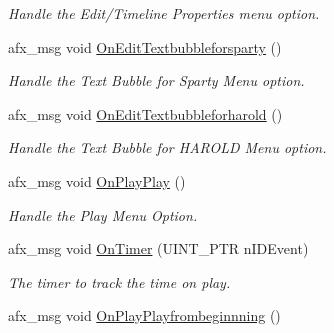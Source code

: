 \begin{DoxyCompactItemize}
\begin{DoxyCompactList}\small\item\em Handle the Edit/\+Timeline Properties menu option. \end{DoxyCompactList}\item 
\hypertarget{class_c_main_frame_a5210794fc4f5e85a455340a61b25f0c5}{afx\+\_\+msg void \hyperlink{class_c_main_frame_a5210794fc4f5e85a455340a61b25f0c5}{On\+Edit\+Textbubbleforsparty} ()}\label{class_c_main_frame_a5210794fc4f5e85a455340a61b25f0c5}

\begin{DoxyCompactList}\small\item\em Handle the Text Bubble for Sparty Menu option. \end{DoxyCompactList}\item 
\hypertarget{class_c_main_frame_a8dd4bfbe4d04dc6521680afca02110be}{afx\+\_\+msg void \hyperlink{class_c_main_frame_a8dd4bfbe4d04dc6521680afca02110be}{On\+Edit\+Textbubbleforharold} ()}\label{class_c_main_frame_a8dd4bfbe4d04dc6521680afca02110be}

\begin{DoxyCompactList}\small\item\em Handle the Text Bubble for H\+A\+R\+O\+L\+D Menu option. \end{DoxyCompactList}\item 
\hypertarget{class_c_main_frame_ac3d4e57ed47cf13a028f53ba141f329a}{afx\+\_\+msg void \hyperlink{class_c_main_frame_ac3d4e57ed47cf13a028f53ba141f329a}{On\+Play\+Play} ()}\label{class_c_main_frame_ac3d4e57ed47cf13a028f53ba141f329a}

\begin{DoxyCompactList}\small\item\em Handle the Play Menu Option. \end{DoxyCompactList}\item 
afx\+\_\+msg void \hyperlink{class_c_main_frame_a244f55f3c149650ade8e7f66e599897b}{On\+Timer} (U\+I\+N\+T\+\_\+\+P\+T\+R n\+I\+D\+Event)
\begin{DoxyCompactList}\small\item\em The timer to track the time on play. \end{DoxyCompactList}\item 
\hypertarget{class_c_main_frame_a9fba7b1e608163dddb6dd5e18c30aa02}{afx\+\_\+msg void \hyperlink{class_c_main_frame_a9fba7b1e608163dddb6dd5e18c30aa02}{On\+Play\+Playfrombeginnning} ()}\label{class_c_main_frame_a9fba7b1e608163dddb6dd5e18c30aa02}


\end{DoxyCompactItemize}
